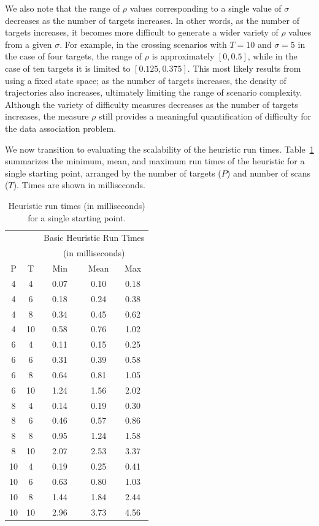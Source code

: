 We also note that the range of $\rho$ values corresponding to a single value of $\sigma$ decreases as the number of targets increases. In other words, as the number of targets increases, it becomes more difficult to generate a wider variety of $\rho$ values from a given $\sigma$. For example, in the crossing scenarios with $T=10$ and $\sigma=5$ in the case of four targets, the range of $\rho$ is approximately $[0,0.5]$, while in the case of ten targets it is limited to $[0.125,0.375]$. This most likely results from using a fixed state space; as the number of targets increases, the density of trajectories also increases, ultimately limiting the range of scenario complexity. Although the variety of difficulty measures decreases as the number of targets increases, the measure $\rho$ still provides a meaningful quantification of difficulty for the data association problem. 

We now transition to evaluating the scalability of the heuristic run times. Table~\ref{tab:Basic_heuristic_times} summarizes the minimum, mean, and maximum run times of the heuristic for a single starting point, arranged by the number of targets ($P$) and number of scans ($T$). Times are shown in milliseconds. 

\begin{table}[ht]
\centering
\begin{tabular}{cc|ccc}
  \hline
   & & \multicolumn{3}{c}{Basic Heuristic Run Times } \\
   & & \multicolumn{3}{c}{(in milliseconds)}\\
   P & T & $\;\;$Min$\:\;$ & Mean & Max \\ 
  \hline
  \hline
   4 & 4 & 0.07 & 0.10 & 0.18 \\ 
   4 & 6 & 0.18 & 0.24 & 0.38 \\ 
   4 & 8 & 0.34 & 0.45 & 0.62 \\ 
   4 & 10 & 0.58 & 0.76 & 1.02 \\ 
   6 & 4 & 0.11 & 0.15 & 0.25 \\ 
   6 & 6 & 0.31 & 0.39 & 0.58 \\ 
   6 & 8 & 0.64 & 0.81 & 1.05 \\ 
   6 & 10 & 1.24 & 1.56 & 2.02 \\ 
   8 & 4 & 0.14 & 0.19 & 0.30 \\ 
   8 & 6 & 0.46 & 0.57 & 0.86 \\ 
   8 & 8 & 0.95 & 1.24 & 1.58 \\ 
   8 & 10 & 2.07 & 2.53 & 3.37 \\ 
   10 & 4 & 0.19 & 0.25 & 0.41 \\ 
   10 & 6 & 0.63 & 0.80 & 1.03 \\ 
   10 & 8 & 1.44 & 1.84 & 2.44 \\ 
   10 & 10 & 2.96 & 3.73 & 4.56 \\ 
   \hline
\end{tabular}
\caption{Heuristic run times (in milliseconds) for a single starting point.}
\label{tab:Basic_heuristic_times}
\end{table}

